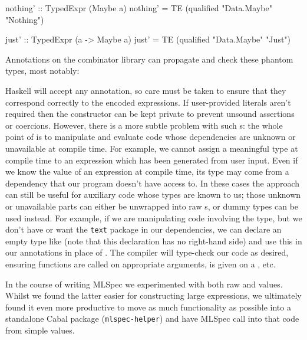 \begin{haskell}
nothing' :: TypedExpr (Maybe a)
nothing' = TE (qualified "Data.Maybe" "Nothing")

just' :: TypedExpr (a -> Maybe a)
just' = TE (qualified "Data.Maybe" "Just")
\end{haskell}

Annotations on the combinator library can propagate and check these phantom
types, most notably:


Haskell will accept any annotation, so care must be taken to ensure that they
correspond correctly to the encoded expressions. If user-provided literals
aren't required then the  constructor can be kept private to prevent
unsound assertions or coercions. However, there is a more subtle problem with
such s: the whole point of \nixeval is to manipulate and evaluate
code whose dependencies are unknown or unavailable at compile time. For example,
we cannot assign a meaningful type at compile time to an expression which has
been generated from user input. Even if we know the value of an expression at
compile time, its type may come from a dependency that our program doesn't have
access to. In these cases the  approach can still be useful for
auxiliary code whose types are known to us; those unknown or unavailable parts
can either be unwrapped into raw s, or dummy types can be used instead.
For example, if we are manipulating code involving the  type,
but we don't have or want the \texttt{text} package in our dependencies, we can
declare an empty type like  (note that this declaration has no
right-hand side) and use this in our annotations in place of
. The compiler will type-check our code as desired, ensuring
functions are called on appropriate arguments,  is given on a
, etc.

In the course of writing MLSpec we experimented with both raw  and
 values. Whilst we found the latter easier for constructing large
expressions, we ultimately found it even more productive to move as much
functionality as possible into a standalone Cabal package
(\texttt{mlspec-helper}) and have MLSpec call into that code from simple
 values.
